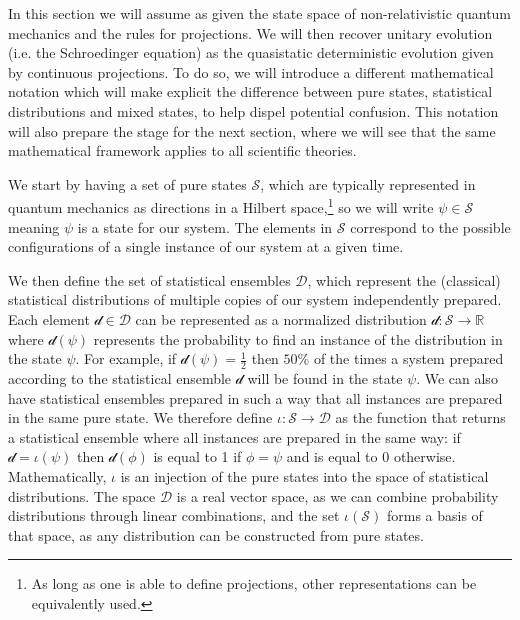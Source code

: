 \documentclass[11pt]{article}
\begin{document}
In this section we will assume as given the state space of non-relativistic quantum mechanics and the rules for projections. We will then recover unitary evolution (i.e. the Schroedinger equation) as the quasistatic deterministic evolution given by continuous projections. To do so, we will introduce a different mathematical notation which will make explicit the difference between pure states, statistical distributions and mixed states, to help dispel potential confusion. This notation will also prepare the stage for the next section, where we will see that the same mathematical framework applies to all scientific theories.

We start by having a set of pure states $\mathcal{S}$, which are typically represented in quantum mechanics as directions in a Hilbert space,\footnote{As long as one is able to define projections, other representations can be equivalently used.} so we will write $\psi \in \mathcal{S}$ meaning $\psi$ is a state for our system. The elements in $\mathcal{S}$ correspond to the possible configurations of a single instance of our system at a given time.

We then define the set of statistical ensembles $\mathcal{D}$, which represent the (classical) statistical distributions of multiple copies of our system independently prepared. Each element $\mathcal{d} \in \mathcal{D}$ can be represented as a normalized distribution $\mathcal{d}: \mathcal{S} \to \mathbb{R}$ where $\mathcal{d}(\psi)$ represents the probability to find an instance of the distribution in the state $\psi$. For example, if $\mathcal{d}(\psi) = \frac{1}{2}$ then $50\%$ of the times a system prepared according to the statistical ensemble $\mathcal{d}$ will be found in the state $\psi$. We can also have statistical ensembles prepared in such a way that all instances are prepared in the same pure state. We therefore define $\iota : \mathcal{S} \to \mathcal{D}$ as the function that returns a statistical ensemble where all instances are prepared in the same way: if $\mathcal{d}=\iota(\psi)$ then $\mathcal{d}(\phi)$ is equal to 1 if $\phi = \psi$ and is equal to 0 otherwise. Mathematically, $\iota$ is an injection of the pure states into the space of statistical distributions. The space $\mathcal{D}$ is a real vector space, as we can combine probability distributions through linear combinations, and the set $\iota(\mathcal{S})$ forms a basis of that space, as any distribution can be constructed from pure states.
\end{document}
